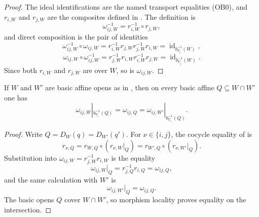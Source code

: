 \begin{proof}
  The ideal identifications are the named transport equalities (OB0), and
  $r_{i,W}$ and $r_{j,W}$ are the composites defined in
  .  The definition is
  \[
    \omega_{ij,W}^{-1}=r_{i,W}^{-1}\circ r_{j,W},
  \]
  and direct composition is the pair of identities
  \[
    \omega_{ij,W}^{-1}\circ\omega_{ij,W}
      =r_{i,W}^{-1}r_{j,W}r_{j,W}^{-1}r_{i,W}
      =\operatorname{id}_{b_{V_i}^{-1}(W)},
  \]
  \[
    \omega_{ij,W}\circ\omega_{ij,W}^{-1}
      =r_{j,W}^{-1}r_{i,W}r_{i,W}^{-1}r_{j,W}
      =\operatorname{id}_{b_{V_j}^{-1}(W)}.
  \]
  Since both $r_{i,W}$ and $r_{j,W}$ are over $W$, so is
  $\omega_{ij,W}$.
\end{proof}

\begin{lemma}
  \label{lemma:nagata-global-blowup-overlap-independent}

  If $W$ and $W'$ are basic affine opens as in
  , then on every basic
  affine $Q\subseteq W\cap W'$ one has
  \[
    \omega_{ij,W}|_{b_{V_i}^{-1}(Q)}
      =\omega_{ij,Q}
      =\omega_{ij,W'}|_{b_{V_i}^{-1}(Q)}.
  \]
\end{lemma}

\begin{proof}
  Write $Q=D_W(q)=D_{W'}(q')$.  For $\nu\in\{i,j\}$, the cocycle equality of
   is
  \[
    r_{\nu,Q}=r_{W,Q}\circ(r_{\nu,W}|_Q)
      =r_{W',Q}\circ(r_{\nu,W'}|_Q).
  \]
  Substitution into $\omega_{ij,W}=r_{j,W}^{-1}r_{i,W}$ is the equality
  \[
    \omega_{ij,W}|_Q=r_{j,Q}^{-1}r_{i,Q}=\omega_{ij,Q},
  \]
  and the same calculation with $W'$ is
  \[
    \omega_{ij,W'}|_Q=\omega_{ij,Q}.
  \]
  The basic opens $Q$ cover
  $W\cap W'$, so morphism locality proves equality on the intersection.
\end{proof}

